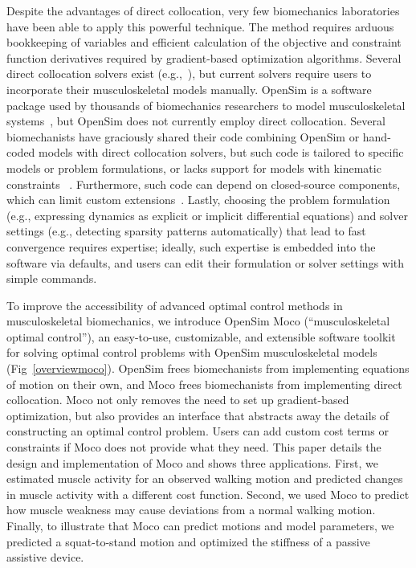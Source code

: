 \documentclass[10pt,letterpaper]{article}
\begin{document}
Despite the advantages of direct collocation, very few biomechanics laboratories have been able to apply this powerful technique. The method requires arduous bookkeeping of variables and efficient calculation of the objective and constraint function derivatives required by gradient-based optimization algorithms. Several direct collocation solvers exist (e.g.,~\cite{Becerra:2010,Patterson:2014}), but current solvers require users to incorporate their musculoskeletal models manually. OpenSim is a software package used by thousands of biomechanics researchers to model musculoskeletal systems~\cite{Delp:2007ij,Seth:2018gg,Sherman:2011byc}, but OpenSim does not currently employ direct collocation. Several biomechanists have graciously shared their code combining OpenSim or hand-coded models with direct collocation solvers, but such code is tailored to specific models or problem formulations, or lacks support for models with kinematic constraints ~\cite{Groote:2016dq,Porsa:2015dn,Lee:2016dn,Lin:2018ex}. Furthermore, such code can depend on closed-source components, which can limit custom extensions~\cite{Groote:2016dq}. Lastly, choosing the problem formulation (e.g., expressing dynamics as explicit or implicit differential equations) and solver settings (e.g., detecting sparsity patterns automatically) that lead to fast convergence requires expertise; ideally, such expertise is embedded into the software via defaults, and users can edit their formulation or solver settings with simple commands.

To improve the accessibility of advanced optimal control methods in musculoskeletal biomechanics, we introduce OpenSim Moco (``musculoskeletal optimal control''), an easy-to-use, customizable, and extensible software toolkit for solving optimal control problems with OpenSim musculoskeletal models (Fig~\ref{overviewmoco}). OpenSim frees biomechanists from implementing equations of motion on their own, and Moco frees biomechanists from implementing direct collocation. Moco not only removes the need to set up gradient-based optimization, but also provides an interface that abstracts away the details of constructing an optimal control problem. Users can add custom cost terms or constraints if Moco does not provide what they need. This paper details the design and implementation of Moco and shows three applications. First, we estimated muscle activity for an observed walking motion and predicted changes in muscle activity with a different cost function. Second, we used Moco to predict how muscle weakness may cause deviations from a normal walking motion. Finally, to illustrate that Moco can predict motions and model parameters, we predicted a squat-to-stand motion and optimized the stiffness of a passive assistive device.
\end{document}

